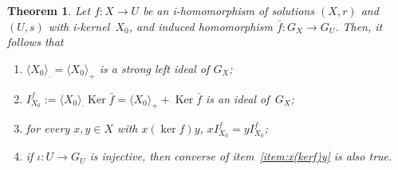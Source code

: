 \documentclass[12pt, a4paper, english]{article}
\newtheorem{teorema}{Theorem}[section]
\theoremstyle{definition}
\theoremstyle{remark}
\DeclareMathOperator{\Ker}{Ker}
\newcommand{\bigcdot}{\boldsymbol{\cdot}}
\begin{document}
\begin{teorema}
\label{teo:X0-kerf-ideal}
Let $f\colon X \rightarrow U$ be an i-homomorphism of solutions $(X,r)$ and $(U,s)$ with i-kernel~$X_0$, and induced homomorphism $\bar{f}\colon G_X \rightarrow G_U$. Then, it follows that
\begin{enumerate}
\item $\langle X_0 \rangle_{\bigcdot} = \langle X_0 \rangle_+$ is a strong left ideal of $G_X$;
\item $I^f_{X_0}:= \langle X_0\rangle_{\bigcdot}\Ker \bar{f} = \langle X_0\rangle_+ + \Ker \bar{f}$ is an ideal of~$G_X$;
\item \label{item:x(kerf)y} for every $x,y \in X$ with $x (\ker f) y$, $xI^f_{X_0} = yI^f_{X_0}$;
\item if $\iota\colon U \rightarrow G_U$ is injective, then converse of item~\ref{item:x(kerf)y} is also true.
\end{enumerate}
\end{teorema}
\end{document}
